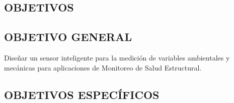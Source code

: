 \documentclass[12pt,letterpaper]{article}
\begin{document}








 \newpage


 \begin{center}
 	\section*{OBJETIVOS}
 \end{center}

\vspace{1cm}

\subsection*{OBJETIVO GENERAL}

Diseñar un sensor inteligente para la medición de variables ambientales y mecánicas para aplicaciones de Monitoreo de Salud Estructural.

\subsection*{OBJETIVOS ESPECÍFICOS}
\end{document}
